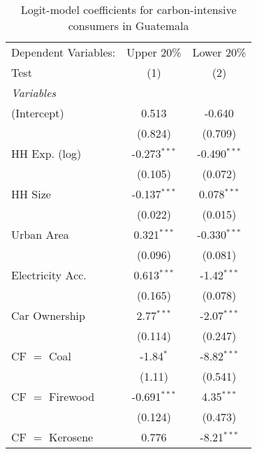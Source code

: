 
\begin{table}[htbp!]
   \centering
   \small
   \begin{adjustbox}{width = 1\textwidth, max height = 0.95\textheight, center}
      \begin{threeparttable}[b]
         \caption{\label{tab:Logit_1_GTM} Logit-model coefficients for carbon-intensive consumers in Guatemala}
         \begin{tabular}{lcc}
            \tabularnewline \midrule \midrule
            Dependent Variables: & Upper 20\%     & Lower 20\%\\   
            Test                 & (1)            & (2)\\  
            \midrule
            \emph{Variables}\\
            (Intercept)          & 0.513          & -0.640\\   
                                 & (0.824)        & (0.709)\\   
            HH Exp. (log)        & -0.273$^{***}$ & -0.490$^{***}$\\   
                                 & (0.105)        & (0.072)\\   
            HH Size              & -0.137$^{***}$ & 0.078$^{***}$\\   
                                 & (0.022)        & (0.015)\\   
            Urban Area           & 0.321$^{***}$  & -0.330$^{***}$\\   
                                 & (0.096)        & (0.081)\\   
            Electricity Acc.     & 0.613$^{***}$  & -1.42$^{***}$\\   
                                 & (0.165)        & (0.078)\\   
            Car Ownership        & 2.77$^{***}$   & -2.07$^{***}$\\   
                                 & (0.114)        & (0.247)\\   
            CF $=$ Coal          & -1.84$^{*}$    & -8.82$^{***}$\\   
                                 & (1.11)         & (0.541)\\   
            CF $=$ Firewood      & -0.691$^{***}$ & 4.35$^{***}$\\   
                                 & (0.124)        & (0.473)\\   
            CF $=$ Kerosene      & 0.776          & -8.21$^{***}$\\   

\end{tabular}
\end{threeparttable}
\end{adjustbox}
\end{table}

